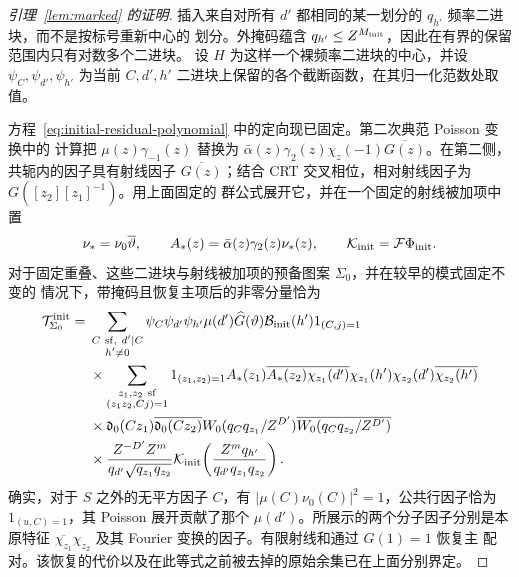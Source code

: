 \documentclass[11pt,a4paper]{article}
\numberwithin{equation}{section}
\numberwithin{figure}{section}
\theoremstyle{definition}
\theoremstyle{remark}
\begin{document}
\begin{proof}[引理~\ref{lem:marked} 的证明]
插入来自对所有 \(d'\) 都相同的某一划分的 \(q_{h'}\) 频率二进块，而不是按标号重新中心的
划分。外掩码蕴含 \(q_{h'}\le Z^{M_{\rm init}}\)，因此在有界的保留范围内只有对数多个二进块。
设 \(H\) 为这样一个裸频率二进块的中心，并设 \(\psi_C,\psi_{d'},\psi_{h'}\) 为当前
\(C,d',h'\) 二进块上保留的各个截断函数，在其归一化范数处取值。

方程~\eqref{eq:initial-residual-polynomial} 中的定向现已固定。第二次典范 Poisson 变换中的
计算把 \(\mu(z)\gamma_{-1}(z)\) 替换为
\(\bar\alpha(z)\gamma_2(z)\chi_z(-1)\overline{G(z)}\)。在第二侧，共轭内的因子具有射线因子
\(\overline{G(z)}\)；结合 CRT 交叉相位，相对射线因子为 \(G([z_2][z_1]^{-1})\)。用上面固定的
群公式展开它，并在一个固定的射线被加项中置
\[
 \nu_*=\nu_0\overline\vartheta,\qquad
 A_*(z)=\bar\alpha(z)\gamma_2(z)\nu_*(z),\qquad
 \mathcal K_{\rm init}=\mathcal F\Phi_{\rm init}.
\]
对于固定重叠、这些二进块与射线被加项的预备图案 \(\Sigma_0\)，并在较早的模式固定不变的
情况下，带掩码且恢复主项后的非零分量恰为
\begin{equation}\label{eq:initial-formal-component}
 \begin{split}
 \mathcal T^{\rm init}_{\Sigma_0}={}&
 \sum_{\substack{C\ {\rm sf},\ d'\mid C\\h'\ne0}}
 \psi_C\psi_{d'}\psi_{h'}\mu(d')\widehat G(\vartheta)
 \mathcal B_{\rm init}(h')1_{(C,j)=1}\\
 &\times\sum_{\substack{z_1,z_2\ {\rm sf}\\(z_1z_2,Cj)=1}}
 1_{(z_1,z_2)=1}
 A_*(z_1)\overline{A_*(z_2)}
 \overline{\chi_{z_1}(d')}\chi_{z_1}(h')
 \chi_{z_2}(d')\overline{\chi_{z_2}(h')}\\
 &\times\mathfrak d_0(Cz_1)\overline{\mathfrak d_0(Cz_2)}
 W_0(q_Cq_{z_1}/Z^{D'})\overline{W_0(q_Cq_{z_2}/Z^{D'})}\\
 &\times\frac{Z^{-D'}Z^m}{q_{d'}\sqrt{q_{z_1}q_{z_2}}}
 \mathcal K_{\rm init}\!\left(
       \frac{Z^mq_{h'}}{q_{d'}q_{z_1}q_{z_2}}\right).
 \end{split}
\end{equation}
确实，对于 \(S\) 之外的无平方因子 \(C\)，有 \(|\mu(C)\nu_0(C)|^2=1\)，公共行因子恰为
\(1_{(u,C)=1}\)，其 Poisson 展开贡献了那个 \(\mu(d')\)。所展示的两个分子因子分别是本原特征
\(\overline{\chi_{z_1}}\chi_{z_2}\) 及其 Fourier 变换的因子。有限射线和通过 \(G(1)=1\) 恢复主
配对。该恢复的代价以及在此等式之前被去掉的原始余集已在上面分别界定。


\end{proof}
\end{document}
